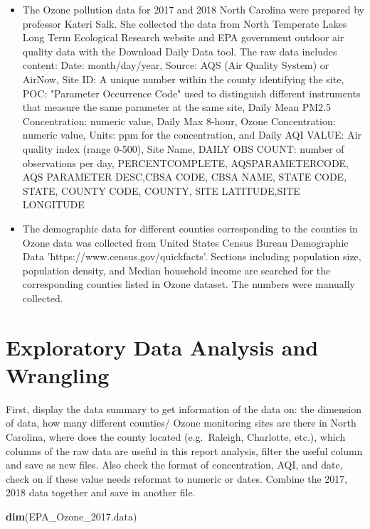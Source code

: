 \documentclass[12pt,]{article}
\newenvironment{Shaded}{\begin{snugshade}}{\end{snugshade}}
\newcommand{\KeywordTok}[1]{\textcolor[rgb]{0.13,0.29,0.53}{\textbf{#1}}}
\newcommand{\FloatTok}[1]{\textcolor[rgb]{0.00,0.00,0.81}{#1}}
\newcommand{\NormalTok}[1]{#1}
\begin{document}
\begin{itemize}
\item[]The Ozone pollution data for 2017 and 2018 North Carolina were prepared by professor Kateri Salk. She collected the data from North Temperate Lakes Long Term Ecological Research website and EPA government outdoor air quality data with the Download Daily Data tool. The raw data includes content: Date: month/day/year, Source: AQS (Air Quality System) or AirNow, Site ID: A unique number within the county identifying the site, POC: "Parameter Occurrence Code" used to distinguish different instruments that measure the same parameter at the same site, Daily Mean PM2.5 Concentration: numeric value, Daily Max 8-hour, Ozone Concentration: numeric value, Units: ppm for the concentration, and Daily AQI VALUE: Air quality index (range 0-500), Site Name, DAILY OBS COUNT: number of observations per day, PERCENTCOMPLETE, AQSPARAMETERCODE, AQS PARAMETER DESC,CBSA CODE, CBSA NAME, STATE CODE, STATE, COUNTY CODE, COUNTY, SITE LATITUDE,SITE LONGITUDE
\item[]The demographic data for different counties corresponding to the counties in Ozone data was collected from United States Census Bureau Demographic Data 'https://www.census.gov/quickfacts'. Sections including population size, population density, and Median household income are searched for the corresponding counties listed in Ozone dataset. The numbers were manually collected.
\end{itemize}

\newpage

\section{Exploratory Data Analysis and
Wrangling}\label{exploratory-data-analysis-and-wrangling}

 First, display the data summary to get information of the data on: the
dimension of data, how many different counties/ Ozone monitoring sites
are there in North Carolina, where does the county located
(e.g.~Raleigh, Charlotte, etc.), which columns of the raw data are
useful in this report analysis, filter the useful column and save as new
files. Also check the format of concentration, AQI, and date, check on
if these value needs reformat to numeric or dates. Combine the 2017,
2018 data together and save in another file.

\begin{Shaded}
\begin{Highlighting}[]
\KeywordTok{dim}\NormalTok{(EPA_Ozone_}\FloatTok{2017.}\NormalTok{data)}
\end{Highlighting}
\end{Shaded}
\end{document}
